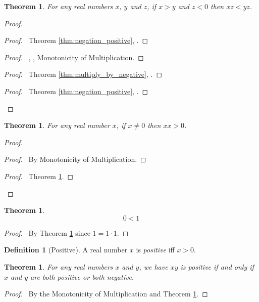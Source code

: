 \documentclass{report}
\let\qed\relax
\newtheorem{thm}[ax]{Theorem}
\theoremstyle{definition}
\newtheorem{df}[ax]{Definition}
\begin{document}
\begin{thm}
\label{thm:multiplication_antitone}
For any real numbers $x$, $y$ and $z$, if $x > y$ and $z < 0$ then $xz < yz$.
\end{thm}

\begin{proof}
\pf
{}
\begin{proof}
	\pf\ Theorem \ref{thm:negation_positive}, .
\end{proof}
\begin{proof}
	\pf\ , , Monotonicity of Multiplication.
\end{proof}
\begin{proof}
	\pf\ Theorem \ref{thm:multiply_by_negative}, .
\end{proof}
\begin{proof}
	\pf\ Theorem \ref{thm:negation_positive}, .
\end{proof}
\qed
\end{proof}

\begin{thm}
\label{thm:square_positive}
For any real number $x$, if $x \neq 0$ then $xx > 0$.
\end{thm}

\begin{proof}
\pf
{}
\begin{proof}
	\pf\ By Monotonicity of Multiplication.
\end{proof}
\begin{proof}
	\pf\ Theorem \ref{thm:multiplication_antitone}.
\end{proof}
\qed
\end{proof}

\begin{thm}
\[ 0 < 1 \]
\end{thm}

\begin{proof}
\pf\ By Theorem \ref{thm:square_positive} since $1 = 1 \cdot 1$. \qed
\end{proof}

\begin{df}[Positive]
A real number $x$ is \emph{positive} iff $x > 0$.
\end{df}

\begin{thm}
For any real numbers $x$ and $y$, we have $xy$ is positive if and only if $x$ and $y$ are both positive or both negative.
\end{thm}

\begin{proof}
\pf\ By the Monotonicity of Multiplication and Theorem \ref{thm:multiplication_antitone}. \qed
\end{proof}
\end{document}
